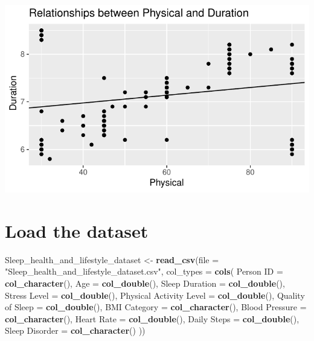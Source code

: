 \documentclass[
  11pt,
]{article}
\newenvironment{Shaded}{\begin{snugshade}}{\end{snugshade}}
\newcommand{\AttributeTok}[1]{\textcolor[rgb]{0.13,0.29,0.53}{#1}}
\newcommand{\FunctionTok}[1]{\textcolor[rgb]{0.13,0.29,0.53}{\textbf{#1}}}
\newcommand{\NormalTok}[1]{#1}
\newcommand{\OtherTok}[1]{\textcolor[rgb]{0.56,0.35,0.01}{#1}}
\newcommand{\StringTok}[1]{\textcolor[rgb]{0.31,0.60,0.02}{#1}}
\begin{document}
\begin{center}\includegraphics[width=0.7\linewidth]{SleepHelath_files/figure-latex/unnamed-chunk-31-1} \end{center}

\hypertarget{load-the-dataset-1}{%
\section{Load the dataset}\label{load-the-dataset-1}}

\begin{Shaded}
\begin{Highlighting}[]
\NormalTok{Sleep\_health\_and\_lifestyle\_dataset }\OtherTok{\textless{}{-}} \FunctionTok{read\_csv}\NormalTok{(}\AttributeTok{file =} \StringTok{"Sleep\_health\_and\_lifestyle\_dataset.csv"}\NormalTok{,}
  \AttributeTok{col\_types =} \FunctionTok{cols}\NormalTok{(}
    \StringTok{\textquotesingle{}Person ID\textquotesingle{}} \OtherTok{=} \FunctionTok{col\_character}\NormalTok{(),}
    \StringTok{\textquotesingle{}Age\textquotesingle{}} \OtherTok{=} \FunctionTok{col\_double}\NormalTok{(),}
    \StringTok{\textquotesingle{}Sleep Duration\textquotesingle{}} \OtherTok{=} \FunctionTok{col\_double}\NormalTok{(),}
    \StringTok{\textquotesingle{}Stress Level\textquotesingle{}} \OtherTok{=} \FunctionTok{col\_double}\NormalTok{(),}
    \StringTok{\textquotesingle{}Physical Activity Level\textquotesingle{}} \OtherTok{=} \FunctionTok{col\_double}\NormalTok{(),}
    \StringTok{\textquotesingle{}Quality of Sleep\textquotesingle{}} \OtherTok{=} \FunctionTok{col\_double}\NormalTok{(),}
    \StringTok{\textquotesingle{}BMI Category\textquotesingle{}} \OtherTok{=} \FunctionTok{col\_character}\NormalTok{(),}
    \StringTok{\textquotesingle{}Blood Pressure\textquotesingle{}} \OtherTok{=} \FunctionTok{col\_character}\NormalTok{(),}
    \StringTok{\textquotesingle{}Heart Rate\textquotesingle{}} \OtherTok{=} \FunctionTok{col\_double}\NormalTok{(),}
    \StringTok{\textquotesingle{}Daily Steps\textquotesingle{}} \OtherTok{=} \FunctionTok{col\_double}\NormalTok{(),}
    \StringTok{\textquotesingle{}Sleep Disorder\textquotesingle{}} \OtherTok{=} \FunctionTok{col\_character}\NormalTok{()}
\NormalTok{  ))}
\end{Highlighting}
\end{Shaded}
\end{document}
